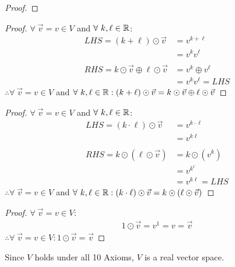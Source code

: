 \begin{enumerate}
\begin{proof}
  \end{proof}
  \begin{proof}
    $\forall~\vec{v} = v \in V$ and $\forall~k,\ell \in \mathbb{R}$:
    \begin{align*}
      LHS = (k + \ell) \odot \vec{v}                  & = v^{k+\ell}        \\
                                                      & = v^kv^\ell         \\ \\
      RHS = k \odot \vec{v} \oplus \ell \odot \vec{v} & = v^k \oplus v^\ell \\
                                                      & = v^kv^\ell = LHS
    \end{align*}
    $\therefore \forall~\vec{v} = v \in V$ and $\forall~k,\ell \in \mathbb{R}: (k + \ell) \odot \vec{v} = k \odot \vec{v} \oplus \ell \odot \vec{v}$
  \end{proof}
  \begin{proof}
    $\forall~\vec{v} = v \in V$ and $\forall~k,\ell \in \mathbb{R}$:
    \begin{align*}
      LHS = (k \cdot \ell) \odot \vec{v} & = v^{k \cdot \ell} \\
                                         & = v^{k\ell}        \\ \\
      RHS = k \odot (\ell \odot \vec{v}) & = k \odot (v^k)    \\
                                         & = v^{k^\ell}       \\
                                         & = v^{k\ell} = LHS
    \end{align*}
    $\therefore \forall~\vec{v} = v \in V$ and $\forall~k,\ell \in \mathbb{R}: (k \cdot \ell) \odot \vec{v} = k \odot (\ell \odot \vec{v})$
  \end{proof}
  \begin{proof}
    $\forall~\vec{v} = v \in V$:
    \begin{align*}
      1 \odot \vec{v} = v^1 = v = \vec{v}
    \end{align*}
    $\therefore \forall~\vec{v} = v \in V: 1 \odot \vec{v} = \vec{v}$
  \end{proof}
  Since $V$ holds under all 10 Axioms, $V$ is a real vector space.
\end{enumerate}

